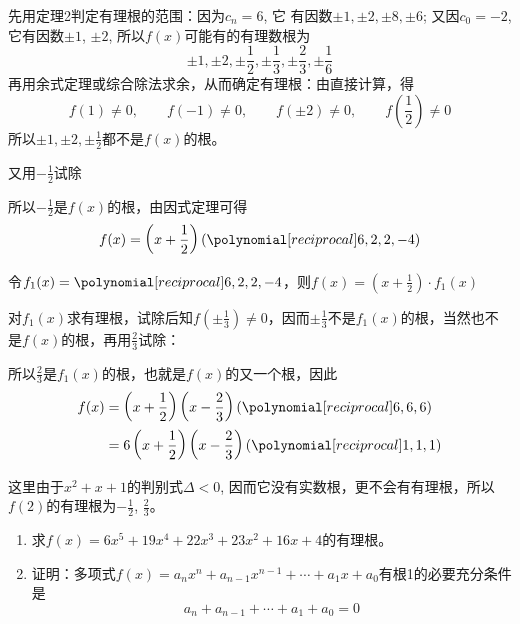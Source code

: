 \begin{solution}
    先用定理2判定有理根的范围：因为$c_n=6$, 它
    有因数$\pm 1,\pm 2,\pm 8,\pm 6$; 又因$c_0=-2$, 它有因数$\pm 1$, 
$\pm 2$, 所以$f(x)$可能有的有理数根为
\[\pm 1, \pm 2, \pm \frac{1}{2}, \pm \frac{1}{3}, \pm \frac{2}{3}, \pm \frac{1}{6}\]
再用余式定理或综合除法求余，从而确定有理根：由直接计算，得
\[f(1)\ne 0,\qquad f(-1)\ne 0,\qquad f(\pm 2)\ne 0,\qquad f\left(\frac{1}{2}\right)\ne 0\]
所以$\pm 1,\pm 2,\pm\frac{1}{2}$都不是$f(x)$的根。

又用$-\frac{1}{2}$试除
\begin{center}
\end{center}
所以$-\frac{1}{2}$是$f(x)$的根，由因式定理可得
\[f(x)=\left(x+\frac{1}{2}\right)(\poly{6,2,2,-4})\]

令$f_1(x)=\poly{6,2,2,-4}$，则$f(x)=\left(x+\frac{1}{2}\right)\cdot f_1(x)$

对$f_1(x)$求有理根，试除后知$f\left(\pm\frac{1}{3}\right)\ne 0$，因而$\pm\frac{1}{3}$不是$f_1(x)$的根，当然也不是$f(x)$的根，再用$\frac{2}{3}$试除：
\begin{center}
\end{center}
所以$\frac{2}{3}$是$f_1(x)$的根，也就是$f(x)$的又一个根，因此
\[\begin{split}
    f(x)&=\left(x+\frac{1}{2}\right)\left(x-\frac{2}{3}\right)(\poly{6,6,6})\\
    &=6\left(x+\frac{1}{2}\right)\left(x-\frac{2}{3}\right)(\poly{1,1,1})
\end{split}\]

这里由于$x^2+x+1$的判别式$\Delta<0$, 因而它没有实数根，更不会有有理根，所以$f(2)$的有理根为$-\frac{1}{2}$, $\frac{2}{3}$。
\end{solution}

\begin{ex}
\begin{enumerate}
    \item 求$f(x)=6x^5+19x^4+22x^3+23x^2+16x+4$的有理根。
    \item 证明：多项式$f(x)=a_nx^n+a_{n-1}x^{n-1}+\cdots+a_1x+a_0$有根1的必要充分条件是
    \[ a_n+a_{n-1}+\cdots +a_1+a_0=0\]
\end{enumerate}
\end{ex}

